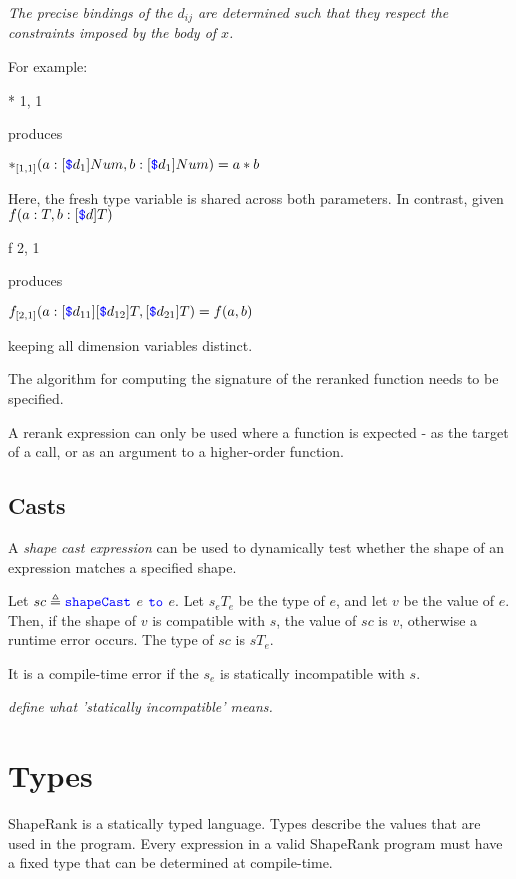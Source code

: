 \documentclass{article}
\begin{document}
{{\em
The precise bindings of the $d_{ij}$ are determined such that they respect the constraints imposed by the body of $x$.

For example:

\RERANK{} * \TO{} 1, 1

produces

$*_{[1,1]}(a: [\texttt{\color{blue} \$}{}d_1] Num, b: [\texttt{\color{blue} \$}{}d_1] Num) = a * b$

Here, the fresh type variable is shared across both parameters. In contrast, given  $f(a: T, b: [\texttt{\color{blue} \$}{}d] T)$

\RERANK{} f \TO{} 2, 1

 produces

$f_{[2,1]}(a: [\texttt{\color{blue} \$}{}d_{11}][\texttt{\color{blue} \$}{}d_{12}] T, [\texttt{\color{blue} \$}{}d_{21}] T) = f(a, b)$

keeping all dimension variables distinct.

The algorithm for computing the signature of the reranked function needs to be specified.
}

A rerank expression can only be used where a function is expected - as the target of a call, or as an argument to a higher-order function.

\subsection{Casts}
\label{casts}

A {\em shape cast expression} can be used to dynamically test whether the shape of an expression matches a specified shape.

\ShapeCastExpression

Let $sc \triangleq \texttt{\color{blue} shapeCast}{}$ $e$ $\texttt{\color{blue} to}{}$ $e$.
Let $s_e T_e$ be the type of $e$, and let $v$ be the value of $e$.
Then, if the shape of $v$ is compatible with $s$, the value of $sc$ is $v$, otherwise a runtime error occurs. The type of $sc$ is $s T_e$. 

It is a compile-time error if the $s_e$ is statically incompatible with $s$.

{\em define what 'statically incompatible' means.}



\section{Types}
\label{types}

ShapeRank is a statically typed language. Types describe the values that are used in the program. Every expression in a valid ShapeRank program must have a fixed type that can be determined at compile-time.

}
\end{document}
